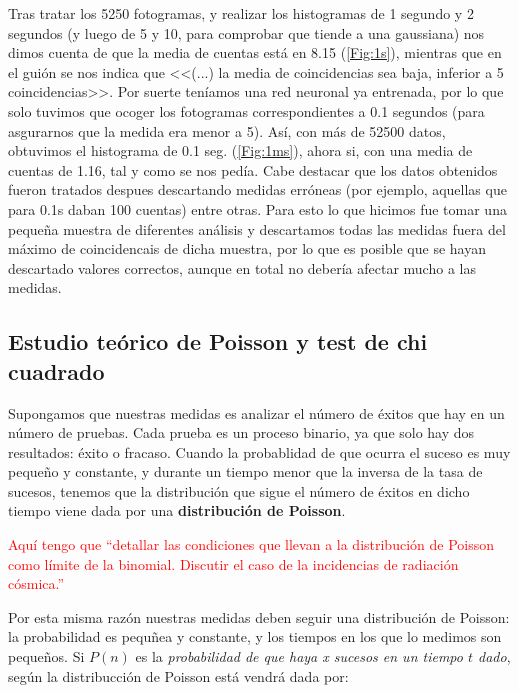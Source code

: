 \documentclass[11pt]{article}
\begin{document}
\vspace{1em}

Tras tratar los 5250 fotogramas, y realizar los histogramas de 1 segundo y 2 segundos (y luego de 5 y 10, para comprobar que tiende a una gaussiana) nos dimos cuenta de que la media de cuentas está en 8.15 (\cref{Fig:1s}), mientras que en el guión \cite{P2} se nos indica que <<(...) la media de coincidencias sea baja, inferior a 5 coincidencias>>. Por suerte teníamos una red neuronal ya entrenada, por lo que solo tuvimos que ocoger los fotogramas correspondientes a 0.1 segundos (para asgurarnos que la medida era menor a 5). Así, con más de 52500 datos, obtuvimos el histograma de 0.1 seg. (\cref{Fig:1ms}), ahora si, con una media de cuentas de 1.16, tal y como se nos pedía. Cabe destacar que los datos obtenidos fueron tratados despues descartando medidas erróneas (por ejemplo, aquellas que para 0.1s daban 100 cuentas) entre otras. Para esto lo que hicimos fue tomar una pequeña muestra de diferentes análisis y descartamos todas las medidas fuera del máximo de coincidencais de dicha muestra, por lo que es posible que se hayan descartado valores correctos, aunque en total no debería afectar mucho a las medidas. 

\subsection{Estudio teórico de Poisson y test de chi cuadrado} 

Supongamos que nuestras medidas es analizar el número de éxitos que hay en un número de pruebas. Cada prueba es un proceso binario, ya que solo hay dos resultados: éxito o fracaso. Cuando la probablidad de que ocurra el suceso es muy pequeño y constante, y durante un tiempo menor que la inversa de la tasa de sucesos, tenemos que la distribución que sigue el número de éxitos en dicho tiempo viene dada por una \textbf{distribución de Poisson}.

\begin{Anotacion}
	\textcolor{red}{Aquí tengo que ``detallar las condiciones que llevan a la distribución de Poisson como límite de la binomial. Discutir el caso de la incidencias de radiación cósmica.''}
\end{Anotacion}


Por esta misma razón nuestras medidas deben seguir una distribución de Poisson: la probabilidad es pequñea y constante, y los tiempos en los que lo medimos son pequeños. Si $P(n)$ es la \textit{probabilidad de que haya x sucesos en un tiempo $t$ dado}, según la distribucción de Poisson está vendrá dada por: 
\end{document}
